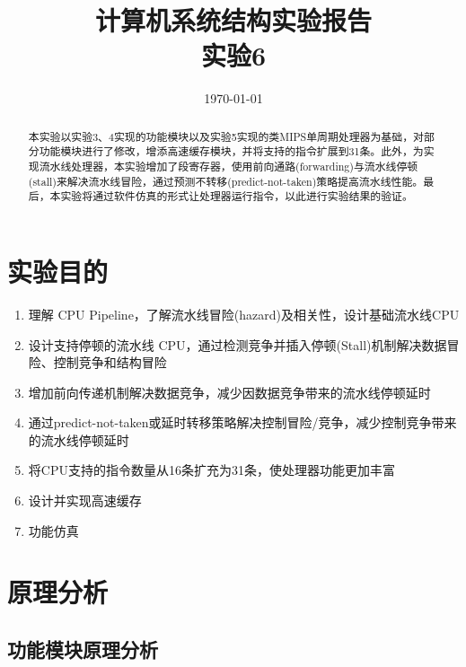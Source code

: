 \documentclass[UTF8]{ctexart}
\title{计算机系统结构实验报告\\实验6}
\date{\today}
\begin{document}
\maketitle
\thispagestyle{empty}
\begin{abstract}
    本实验以实验3、4实现的功能模块以及实验5实现的类MIPS单周期处理器为基础，对部分功能模块进行了修改，增添高速缓存模块，并将支持的指令扩展到31条。此外，为实现流水线处理器，本实验增加了段寄存器，使用前向通路(forwarding)与流水线停顿(stall)来解决流水线冒险，通过预测不转移(predict-not-taken)策略提高流水线性能。最后，本实验将通过软件仿真的形式让处理器运行指令，以此进行实验结果的验证。
\end{abstract}  
\tableofcontents
\clearpage

\section{实验目的}
\begin{enumerate}
    \item 理解 CPU Pipeline，了解流水线冒险(hazard)及相关性，设计基础流水线CPU
    \item 设计支持停顿的流水线 CPU，通过检测竞争并插入停顿(Stall)机制解决数据冒险、控制竞争和结构冒险
    \item 增加前向传递机制解决数据竞争，减少因数据竞争带来的流水线停顿延时
    \item 通过predict-not-taken或延时转移策略解决控制冒险/竞争，减少控制竞争带来的流水线停顿延时
    \item 将CPU支持的指令数量从16条扩充为31条，使处理器功能更加丰富
    \item 设计并实现高速缓存
    \item 功能仿真
\end{enumerate}
\section{原理分析}
\subsection{功能模块原理分析}
\end{document}
